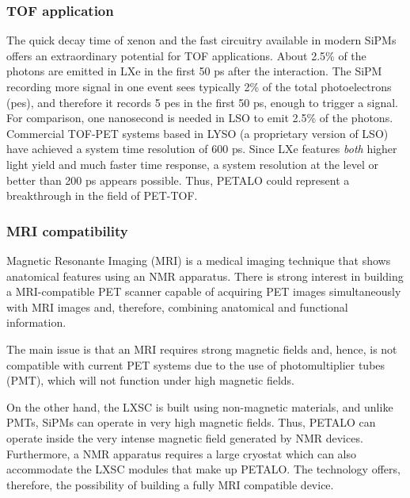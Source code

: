 %
%
\subsubsection*{TOF application}

The quick decay time of xenon and the fast circuitry available in modern SiPMs offers an extraordinary potential for TOF applications. About 2.5\% of the photons are emitted in LXe in the first 50 ps after the interaction. The SiPM recording more signal in one event sees typically  2\% of the total photoelectrons (pes), and therefore it records 5 pes in the first 50 ps, enough to trigger a signal. For comparison, one nanosecond is needed in LSO to emit 2.5\% of the photons. Commercial TOF-PET systems based in LYSO (a proprietary version of LSO) have achieved a system time resolution of 600 ps. Since LXe features {\em both} higher light yield and much faster time response, a system resolution at the level or better than 200 ps appears possible. Thus, PETALO could represent a breakthrough in the field of PET-TOF. 

\subsubsection*{MRI compatibility}

Magnetic Resonante Imaging (MRI) is a medical imaging technique that shows anatomical features using an NMR apparatus. There is strong interest in building a MRI-compatible PET scanner capable of acquiring PET images simultaneously with MRI images and, therefore, combining anatomical and functional information.

The main issue is that an MRI requires strong magnetic fields and, hence, is not compatible with current PET systems due to the use of photomultiplier tubes (PMT), which will not function under high magnetic fields.

On the other hand, the LXSC is built using non-magnetic materials, and unlike PMTs, SiPMs can operate in very high magnetic fields. Thus, PETALO can operate inside the very intense magnetic field generated by NMR devices. Furthermore, a NMR apparatus requires a large cryostat which can also accommodate the LXSC modules that make up PETALO. The technology offers, therefore, the possibility of building a fully MRI compatible device.  

